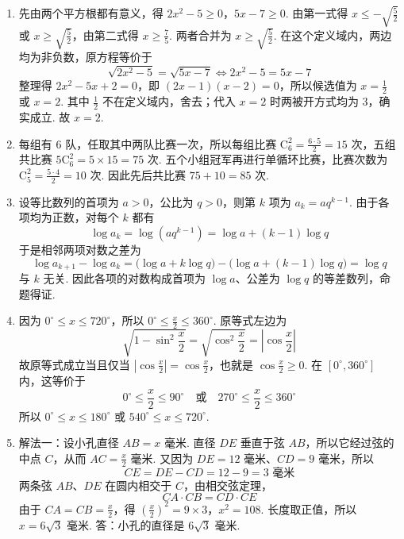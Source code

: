 \begin{solution}
\begin{enumerate}
\item
先由两个平方根都有意义，得
\(2x^{2}-5\geqslant0\)，\(5x-7\geqslant0\).
由第一式得 \(x\leqslant-\sqrt{\frac52}\) 或 \(x\geqslant\sqrt{\frac52}\)，由第二式得 \(x\geqslant\frac75\). 两者合并为 \(x\geqslant\sqrt{\frac52}\). 在这个定义域内，两边均为非负数，原方程等价于
\[
\sqrt{2x^{2}-5}=\sqrt{5x-7}
\Longleftrightarrow 2x^{2}-5=5x-7
\]
整理得 \(2x^{2}-5x+2=0\)，即 \((2x-1)(x-2)=0\)，所以候选值为 \(x=\frac12\) 或 \(x=2\). 其中 \(\frac12\) 不在定义域内，舍去；代入 \(x=2\) 时两被开方式均为 \(3\)，确实成立. 故 \(x=2\).

\item
每组有 \(6\) 队，任取其中两队比赛一次，所以每组比赛 \(\mathrm C_6^2=\frac{6\cdot5}{2}=15\) 次，五组共比赛 \(5\mathrm C_6^2=5\times15=75\) 次. 五个小组冠军再进行单循环比赛，比赛次数为 \(\mathrm C_5^2=\frac{5\cdot4}{2}=10\) 次.
因此先后共比赛 \(75+10=85\) 次.

\item
设等比数列的首项为 \(a>0\)，公比为 \(q>0\)，则第 \(k\) 项为 \(a_k=aq^{k-1}\). 由于各项均为正数，对每个 \(k\) 都有
\[
\log a_k=\log\left(aq^{k-1}\right)=\log a+(k-1)\log q
\]
于是相邻两项对数之差为
\[
\log a_{k+1}-\log a_k=\bigl(\log a+k\log q\bigr)-\bigl(\log a+(k-1)\log q\bigr)=\log q
\]
与 \(k\) 无关. 因此各项的对数构成首项为 \(\log a\)、公差为 \(\log q\) 的等差数列，命题得证.

\item
因为 \(0^{\circ}\leqslant x\leqslant720^{\circ}\)，所以 \(0^{\circ}\leqslant\frac{x}{2}\leqslant360^{\circ}\). 原等式左边为
\[
\sqrt{1-\sin^{2}\frac{x}{2}}=\sqrt{\cos^{2}\frac{x}{2}}=\left|\cos\frac{x}{2}\right|
\]
故原等式成立当且仅当 \(\left|\cos\frac{x}{2}\right|=\cos\frac{x}{2}\)，也就是 \(\cos\frac{x}{2}\geqslant0\). 在 \([0^{\circ},360^{\circ}]\) 内，这等价于
\[
0^{\circ}\leqslant\frac{x}{2}\leqslant90^{\circ}\quad\text{或}\quad270^{\circ}\leqslant\frac{x}{2}\leqslant360^{\circ}
\]
所以 \(0^{\circ}\leqslant x\leqslant180^{\circ}\) 或 \(540^{\circ}\leqslant x\leqslant720^{\circ}\).

\item
解法一：设小孔直径 \(AB=x\text{ 毫米}\). 直径 \(DE\) 垂直于弦 \(AB\)，所以它经过弦的中点 \(C\)，从而 \(AC=\frac{x}{2}\text{ 毫米}\). 又因为 \(DE=12\text{ 毫米}\)、\(CD=9\text{ 毫米}\)，所以
\[
CE=DE-CD=12-9=3\text{ 毫米}
\]
两条弦 \(AB\)、\(DE\) 在圆内相交于 \(C\)，由相交弦定理，
\[
CA\cdot CB=CD\cdot CE
\]
由于 \(CA=CB=\frac{x}{2}\)，得
\(\left(\frac{x}{2}\right)^2=9\times3\)，\(x^2=108\).
长度取正值，所以 \(x=6\sqrt3\text{ 毫米}\). 答：小孔的直径是 \(6\sqrt3\text{ 毫米}\).


\end{enumerate}
\end{solution}
